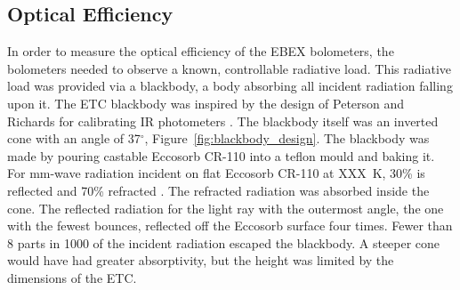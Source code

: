 \subsection{Optical Efficiency}
\label{sec:optical_efficiency}

%





In order to measure the optical efficiency of the \ac{EBEX} bolometers, the bolometers needed to observe a known, controllable radiative load.
This radiative load was provided via a blackbody, a body absorbing all incident radiation falling upon it. 
The \ac{ETC} blackbody was inspired by the design of Peterson and Richards for calibrating IR photometers \cite{Peterson1984a}. 
The blackbody itself was an inverted cone with an angle of 37$^{\circ}$, Figure~\ref{fig:blackbody_design}. 
The blackbody was made by pouring castable Eccosorb CR-110 into a teflon mould and baking it.
For mm-wave radiation incident on flat Eccosorb CR-110 at XXX~K, 30\% is reflected and 70\% refracted \cite{}.
The refracted radiation was absorbed inside the cone. 
The reflected radiation for the light ray with the outermost angle, the one with the fewest bounces,  
reflected off the Eccosorb surface four times.
Fewer than 8 parts in 1000 of the incident radiation escaped the blackbody. 
A steeper cone would have had greater absorptivity, but the height was limited by the dimensions of the \ac{ETC}. 

